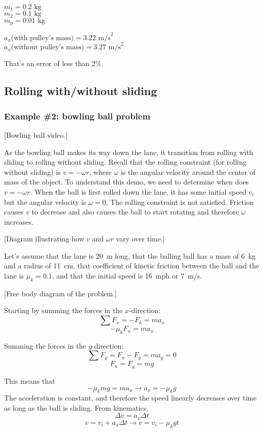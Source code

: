 $m_1=0.2\mbox{ kg}$\\
$m_2=0.1\mbox{ kg}$\\
$m_p=0.01\mbox{ kg}$

$a_x\mbox{(with pulley's mass)}=3.22\mbox{ m/s}^2$\\
$a_x\mbox{(without pulley's mass)}=3.27\mbox{ m/s}^2$

That's an error of less than 2$\%$.




\subsection{Rolling with/without sliding}
\subsubsection*{Example \#2: bowling ball problem}
[Bowling ball video.]

As the bowling ball makes its way down the lane, it transition from rolling with sliding to rolling without sliding. Recall that the rolling constraint (for rolling without sliding) is $v=-\omega r$, where $\omega$ is the angular velocity around the center of mass of the object. To understand this demo, we need to determine when does $v=-\omega r$. When the ball is first rolled down the lane, it has some initial speed $v_i$ but the angular velocity is $\omega=0$. The rolling constraint is not satisfied. Friction causes $v$ to decrease and also causes the ball to start rotating and therefore $\omega$ increases.

[Diagram illustrating how $v$ and $\omega r$ vary over time.]
\vspace{4cm}


Let's assume that the lane is 20~m long, that the balling ball has a mass of 6~kg and a radius of 11~cm, that coefficient of kinetic friction between the ball and the lane is $\mu_k=0.1$, and that the initial speed is 16~mph or 7~m/s.

[Free body diagram of the problem.]
\vspace{3cm}

Starting by summing the forces in the $x$-direction:
$$\sum F_x = -F_k = ma_x$$
$$-\mu_kF_n = ma_x$$

Summing the forces in the $y$-direction:
$$\sum F_y = F_n - F_g = ma_y = 0$$
$$F_n = F_g = mg$$

This means that
$$-\mu_kmg = ma_x \rightarrow a_x = -\mu_kg$$
The acceleration is constant, and therefore the speed linearly decreases over time as long as the ball is sliding. From kinematics,
$$\Delta v = a_x\Delta t$$
$$v = v_i + a_x\Delta t \rightarrow \boxed{v = v_i - \mu_kgt}$$

